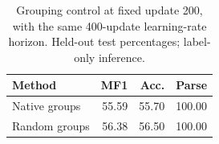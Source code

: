 \begin{table}[t]
\centering\small
\setlength{\tabcolsep}{3pt}
\begin{tabular}{lrrr}
\toprule
Method & MF1 & Acc. & Parse \\
\midrule
Native groups & 55.59 & 55.70 & 100.00 \\
Random groups & 56.38 & 56.50 & 100.00 \\
\bottomrule
\end{tabular}
\caption{Grouping control at fixed update 200, with the same 400-update learning-rate horizon. Held-out test percentages; label-only inference.}
\end{table}
